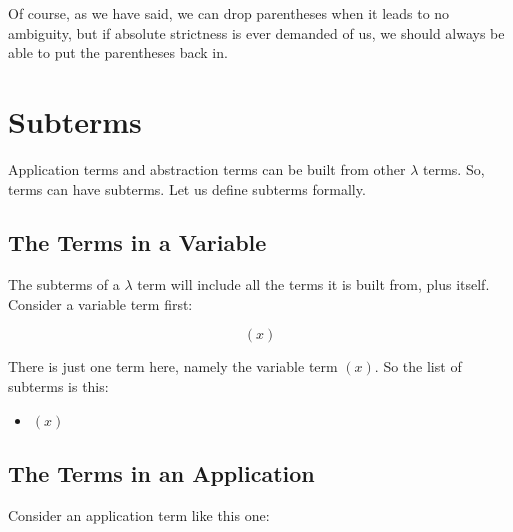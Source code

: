 \documentclass{book}
\numberwithin{equation}{chapter}
\begin{document}
\noindent
Of course, as we have said, we can drop parentheses when it leads to no ambiguity, but if absolute strictness is ever demanded of us, we should always be able to put the parentheses back in.


\chapter{Subterms}

Application terms and abstraction terms can be built from other $\lambda$ terms. So, terms can have subterms. Let us define subterms formally.


\section{The Terms in a Variable}

The subterms of a $\lambda$ term will include all the terms it is built from, plus itself. Consider a variable term first:

\begin{equation}
(x)
\end{equation}

\noindent
There is just one term here, namely the variable term $(x)$. So the list of subterms is this:

\begin{itemize}
\item{$(x)$}
\end{itemize}


\section{The Terms in an Application}

Consider an application term like this one:
\end{document}
